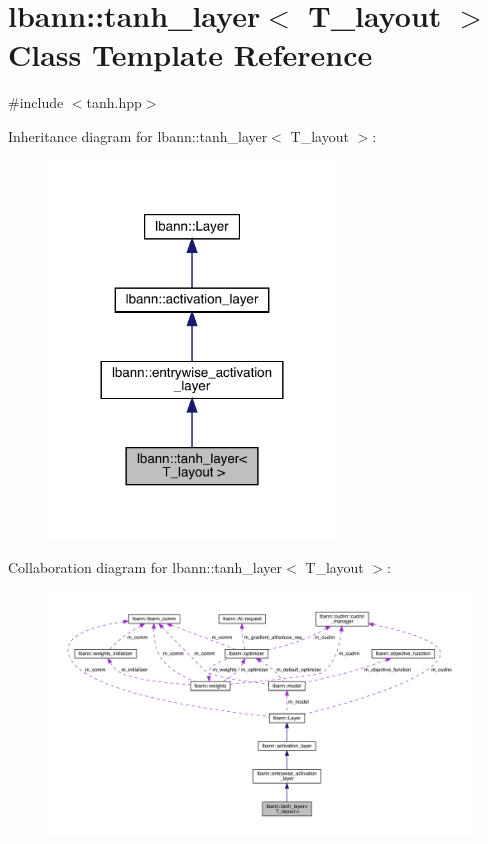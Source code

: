\hypertarget{classlbann_1_1tanh__layer}{}\section{lbann\+:\+:tanh\+\_\+layer$<$ T\+\_\+layout $>$ Class Template Reference}
\label{classlbann_1_1tanh__layer}


{\ttfamily \#include $<$tanh.\+hpp$>$}



Inheritance diagram for lbann\+:\+:tanh\+\_\+layer$<$ T\+\_\+layout $>$\+:\nopagebreak
\begin{figure}[H]
\begin{center}
\leavevmode
\includegraphics[width=216pt]{classlbann_1_1tanh__layer__inherit__graph}
\end{center}
\end{figure}


Collaboration diagram for lbann\+:\+:tanh\+\_\+layer$<$ T\+\_\+layout $>$\+:\nopagebreak
\begin{figure}[H]
\begin{center}
\leavevmode
\includegraphics[width=350pt]{classlbann_1_1tanh__layer__coll__graph}
\end{center}
\end{figure}
